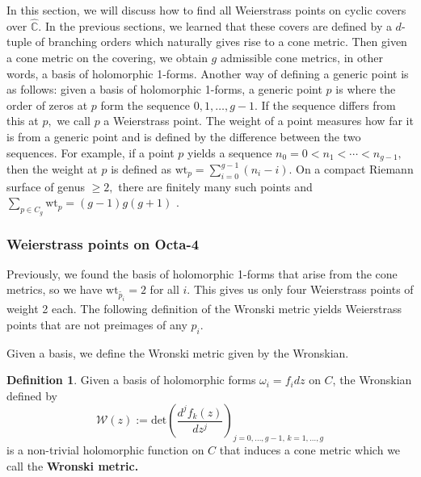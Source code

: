 \documentclass[12pt,reqno]{amsart}
\DeclareMathOperator{\Aut}{Aut}
\newcommand{\C}{\mathbb{C}}
\newtheorem*{proposition}{Proposition}
\theoremstyle{definition}
\newtheorem{defn}{Definition}
\theoremstyle{remark}
\begin{document}
In this section, we will discuss how to find all Weierstrass points on cyclic covers over $\widehat{\C}.$ In the previous sections, we learned that these covers are defined by a $d$-tuple of branching orders which naturally gives rise to a cone metric. Then given a cone metric on the covering, we obtain $g$ admissible cone metrics, in other words, a basis of holomorphic 1-forms. Another way of defining a generic point is as follows: given a basis of holomorphic 1-forms, a generic point $p$ is where the order of zeros at $p$ form the sequence $0, 1, \ldots , g - 1.$ If the sequence differs from this at $p,$ we call $p$ a Weierstrass point. The weight of a point measures how far it is from a generic point and is defined by the difference between the two sequences. For example, if a point $p$ yields a sequence $n_0 = 0 < n_1 < \cdots < n_{g-1},$ then the weight at $p$ is defined as $\textrm{wt}_p = \sum\limits_{i=0}^{g-1} (n_i - i).$ On a compact Riemann surface of genus $\geq 2,$ there are finitely many such points and $\sum\limits_{p \in C_g} \textrm{wt}_p = (g - 1) g (g + 1)$ \cite{fk}. 



\subsubsection*{Weierstrass points on Octa-4} Previously, we found the basis of holomorphic 1-forms that arise from the cone metrics, so we have $\textrm{wt}_{\widetilde{p_i}} = 2$ for all $i.$ This gives us only four Weierstrass points of weight 2 each. The following definition of the Wronski metric yields Weierstrass points that are not preimages of any $p_i.$

Given a basis, we define the Wronski metric given by the Wronskian.

\begin{defn}\label{def: wronski} Given a basis of holomorphic forms $\omega_i = f_i d z$ on $C$, the Wronskian defined by $$\mathcal{W}(z) := \textrm{det} \left( \frac{d^j f_k(z)}{d z^j} \right)_{j = 0, \ldots , g - 1, \, k = 1, \ldots , g}$$ is a non-trivial holomorphic function on $C$ that induces a cone metric which we call the \textbf{Wronski metric.} \end{defn}
\end{document}
